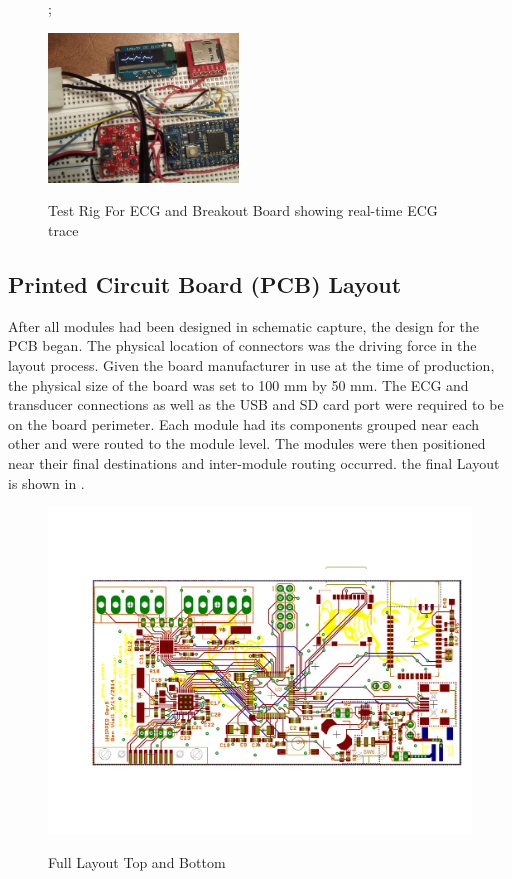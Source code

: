 \begin{figure};
	\begin{center}
		\label{fig:Breakout Test}
		\includegraphics[scale=1,width=0.45\textwidth]{Images/BreadBoardTest.png} 		
		\caption{Test Rig For ECG and  Breakout Board showing real-time ECG trace}
	\end{center}
\end{figure}


\subsection{Printed Circuit Board (PCB) Layout}
After all modules had been designed in schematic capture, the design for the PCB began. The physical location of connectors was the driving force in the layout process. Given the board manufacturer in use at the time of production, the physical size of the board was set to 100 mm by 50 mm. The ECG and  transducer connections as well as the USB and SD card port were required to be on the board perimeter. Each module had its components grouped near each other and were routed to the module level. The modules were then positioned near their final destinations and inter-module routing occurred. the final Layout is shown in .

\begin{figure}[ht]
\begin{center}
	\label{fig:FullLayout}
	\includegraphics[angle=0,scale=1,width=1\textwidth]{Images/rev1D_PCB.pdf} 
	\caption{Full Layout Top and Bottom}
\end{center}
\end{figure}

